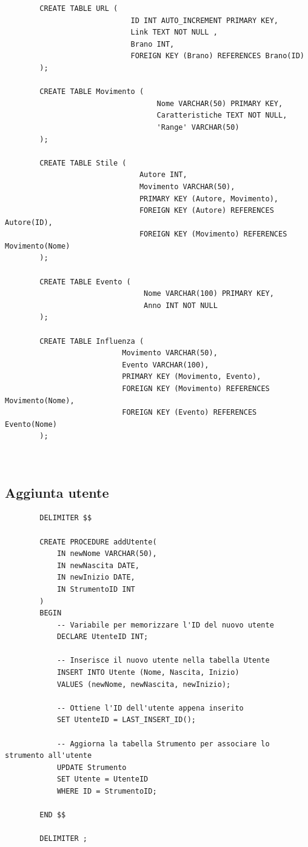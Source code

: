 \documentclass{article}
\begin{document}
\begin{verbatim}
        CREATE TABLE URL (
                             ID INT AUTO_INCREMENT PRIMARY KEY,
                             Link TEXT NOT NULL ,
                             Brano INT,
                             FOREIGN KEY (Brano) REFERENCES Brano(ID)
        );

        CREATE TABLE Movimento (
                                   Nome VARCHAR(50) PRIMARY KEY,
                                   Caratteristiche TEXT NOT NULL,
                                   'Range' VARCHAR(50)
        );

        CREATE TABLE Stile (
                               Autore INT,
                               Movimento VARCHAR(50),
                               PRIMARY KEY (Autore, Movimento),
                               FOREIGN KEY (Autore) REFERENCES Autore(ID),
                               FOREIGN KEY (Movimento) REFERENCES Movimento(Nome)
        );

        CREATE TABLE Evento (
                                Nome VARCHAR(100) PRIMARY KEY,
                                Anno INT NOT NULL
        );

        CREATE TABLE Influenza (
                           Movimento VARCHAR(50),
                           Evento VARCHAR(100),
                           PRIMARY KEY (Movimento, Evento),
                           FOREIGN KEY (Movimento) REFERENCES Movimento(Nome),
                           FOREIGN KEY (Evento) REFERENCES Evento(Nome)
        );



    \end{verbatim}
    
    \subsection{Aggiunta utente}
    
    \begin{verbatim}
        DELIMITER $$

        CREATE PROCEDURE addUtente(
            IN newNome VARCHAR(50),
            IN newNascita DATE,
            IN newInizio DATE,
            IN StrumentoID INT
        )
        BEGIN
            -- Variabile per memorizzare l'ID del nuovo utente
            DECLARE UtenteID INT;

            -- Inserisce il nuovo utente nella tabella Utente
            INSERT INTO Utente (Nome, Nascita, Inizio)
            VALUES (newNome, newNascita, newInizio);

            -- Ottiene l'ID dell'utente appena inserito
            SET UtenteID = LAST_INSERT_ID();

            -- Aggiorna la tabella Strumento per associare lo strumento all'utente
            UPDATE Strumento
            SET Utente = UtenteID
            WHERE ID = StrumentoID;

        END $$

        DELIMITER ;

    \end{verbatim}
    
\end{document}
